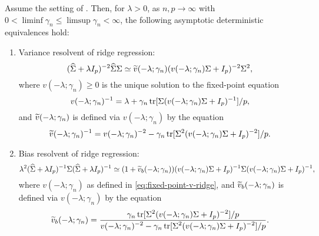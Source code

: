 \documentclass{article}
\begin{document}
\begin{lemma}
    \label{lem:deter-approx-generalized-ridge}
    Assume the setting of .
    Then, for $\lambda > 0$,
    as $n, p \to \infty$
    with $0 < \liminf \gamma_n \le \limsup \gamma_n < \infty$,
    the following asymptotic deterministic equivalences hold:
    \begin{enumerate}
        \item Variance resolvent of ridge regression:
        \begin{equation}
            \label{eq:detequi-ridge-genbias}
            ({\widehat{\Sigma}} + \lambda I_p)^{-2} {\widehat{\Sigma}} \Sigma
            \simeq
            \widetilde{v}(-\lambda; \gamma_n) (v(-\lambda; \gamma_n) \Sigma + I_p)^{-2} \Sigma^2,
        \end{equation}
        where $v(-\lambda; \gamma_n) \ge 0$
        is the unique solution to the fixed-point equation
        \begin{equation}
            \label{eq:fixed-point-v-ridge-statement}
            v(-\lambda; \gamma_n)^{-1}
            = \lambda + \gamma_n \operatorname{tr}[\Sigma (v(-\lambda; \gamma_n) \Sigma + I_p)^{-1}] / p,
        \end{equation}
        and $\widetilde{v}(-\lambda; \gamma_n)$ is defined via 
        $v(-\lambda; \gamma_n)$ by the equation
        \begin{equation}
            \label{eq:def-v'-ridge}
            \widetilde{v}(-\lambda; \gamma_n)^{-1}
            = 
                v(-\lambda; \gamma_n)^{-2}
                - 
                \gamma_n
                \operatorname{tr}[\Sigma^2 (v(-\lambda; \gamma_n) \Sigma + I_p)^{-2}] / p.
        \end{equation}
        \item Bias resolvent of ridge regression:
        \begin{equation}
            \label{eq:detequi-ridge-genvar}
            \lambda^2
            ({\widehat{\Sigma}} + \lambda I_p)^{-1} \Sigma ({\widehat{\Sigma}} + \lambda I_p)^{-1}
            \simeq 
            (1 + \widetilde{v}_b(-\lambda; \gamma_n))
            (v(-\lambda; \gamma_n) \Sigma + I_p)^{-1}
            \Sigma
            (v(-\lambda; \gamma_n) \Sigma + I_p)^{-1},
        \end{equation}
        where $v(-\lambda; \gamma_n)$ as defined in \eqref{eq:fixed-point-v-ridge},
        and $\widetilde{v}_b(-\lambda; \gamma_n)$
        is defined via $v(-\lambda; \gamma_n)$ by the equation
        \begin{equation}
            \label{eq:def-vg'-ridge}
            \widetilde{v}_b(-\lambda; \gamma_n)
            =
            \frac{\displaystyle 
                \gamma_n \operatorname{tr}[\Sigma^2 (v(-\lambda; \gamma_n) \Sigma + I_p)^{-2}] / p
            }{\displaystyle 
                v(-\lambda; \gamma_n)^{-2}
                - \gamma_n \operatorname{tr}[\Sigma^2 (v(-\lambda; \gamma_n) \Sigma + I_p)^{-2}] / p
            }.
        \end{equation}
    \end{enumerate}
\end{lemma}
\end{document}

